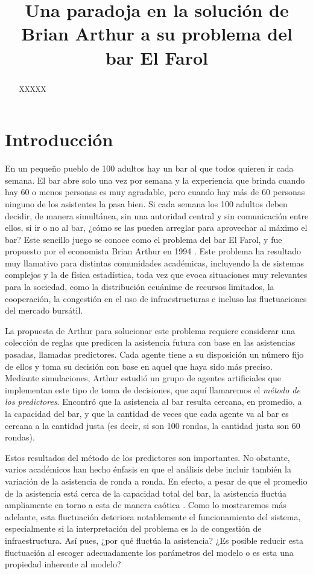 \documentclass[11pt]{amsart}
\title[Una paradoja en El Farol]{Una paradoja en la solución de Brian Arthur a su problema del bar El Farol}
\begin{document}
\maketitle

\begin{abstract}
XXXXX
\end{abstract}

\section{Introducción}
En un pequeño pueblo de 100 adultos hay un bar al que todos quieren ir cada semana. El bar abre solo una vez por semana y la experiencia que brinda cuando hay 60 o menos personas es muy agradable, pero cuando hay más de 60 personas ninguno de los asistentes la pasa bien. Si cada semana los 100 adultos deben decidir, de manera simultánea, sin una autoridad central y sin comunicación entre ellos, si ir o no al bar, ¿cómo se las pueden arreglar para aprovechar al máximo el bar? Este sencillo juego se conoce como el problema del bar El Farol, y fue propuesto por el economista Brian Arthur en 1994 \cite{Arthur1994}. Este problema ha resultado muy llamativo para distintas comunidades académicas, incluyendo la de sistemas complejos y la de física estadística, toda vez que evoca situaciones muy relevantes para la sociedad, como la distribución ecuánime de recursos limitados, la cooperación, la congestión en el uso de infraestructuras e incluso las fluctuaciones del mercado bursátil. 

La propuesta de Arthur para solucionar este problema requiere considerar una colección de reglas que predicen la asistencia futura con base en las asistencias pasadas, llamadas predictores. Cada agente tiene a su disposición un número fijo de ellos y toma su decisión con base en aquel que haya sido más preciso. Mediante simulaciones, Arthur estudió un grupo de agentes artificiales que implementan este tipo de toma de decisiones, que aquí llamaremos el \emph{método de los predictores}. Encontró que la asistencia al bar resulta cercana, en promedio, a la capacidad del bar, y que la cantidad de veces que cada agente va al bar es cercana a la cantidad justa (es decir, si son 100 rondas, la cantidad justa son 60 rondas). 

Estos resultados del método de los predictores son importantes. No obstante, varios académicos han hecho énfasis en que el análisis debe incluir también la variación de la asistencia de ronda a ronda. En efecto, a pesar de que el promedio de la asistencia está cerca de la capacidad total del bar, la asistencia fluctúa ampliamente en torno a esta de manera caótica \cite{Zambrano2004}. Como lo mostraremos más adelante, esta fluctuación deteriora notablemente el funcionamiento del sistema, especialmente si la interpretación del problema es la de congestión de infraestructura. Así pues, ¿por qué fluctúa la asistencia? ¿Es posible reducir esta fluctuación al escoger adecuadamente los parámetros del modelo o es esta una propiedad inherente al modelo?
\end{document}
